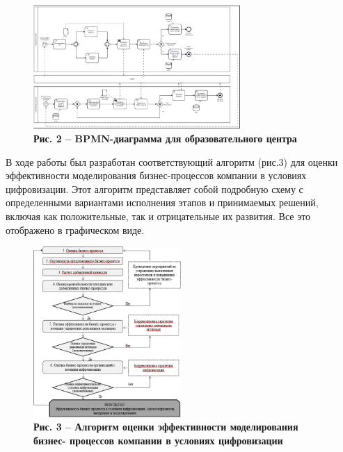 \begin{figure}[H]
	\centering
	\includegraphics[width=0.7\textwidth]{assets/206}
	\caption*{\bfseries Рис. 2 -- BPMN-диаграмма для образовательного центра}
\end{figure}


\begin{multicols}{2}

В ходе работы был разработан соответствующий алгоритм (рис.3) для оценки
эффективности моделирования бизнес-процессов компании в условиях
цифровизации. Этот алгоритм представляет собой подробную схему с
определенными вариантами исполнения этапов и принимаемых решений,
включая как положительные, так и отрицательные их развития. Все это
отображено в графическом виде.
\end{multicols}

\begin{figure}[H]
	\centering
	\includegraphics[width=0.5\textwidth]{assets/207}
	\caption*{\bfseries Рис. 3 -- Алгоритм оценки эффективности моделирования бизнес-
  процессов компании в условиях цифровизации}
\end{figure}

